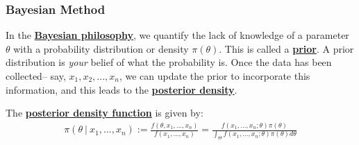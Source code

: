 \documentclass[11pt]{scrartcl}
\theoremstyle{definition}
\theoremstyle{remark}
\newcommand{\dfn}[1]{\textbf{\underline{#1}}}
\newcommand{\idx}[2]{\int_{#1}^{#2}}
\begin{document}
{\subsubsection{Bayesian Method}
In the \dfn{Bayesian philosophy}, we quantify the lack of knowledge of a parameter $\theta$ with a probability distribution or density $\pi(\theta)$. This is called a \dfn{prior}. A prior distribution is \emph{your} belief of what the probability is. Once the data has been collected-- say, $x_1, x_2, ..., x_n$, we can update the prior to incorporate this information, and this leads to the \dfn{posterior density}. 

The \dfn{posterior density function} is given by: 
\begin{align}
	\pi (\theta\ |\ x_1, ..., x_n ) := \frac{f(\theta, x_1, ..., x_n)}{f(x_1,..., x_n)	} = \frac{f(x_1, ..., x_n; \theta) \pi(\theta)}{\idx{\Theta}{} f(x_1, ..., x_n; \theta) \pi(\theta) d \theta}
\end{align}

}
\end{document}
